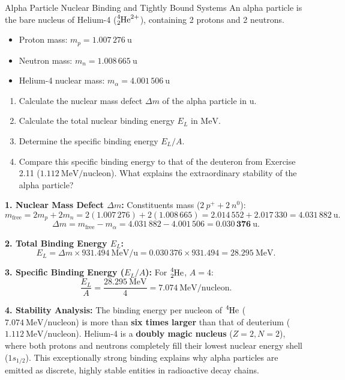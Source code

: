 \begin{exercise}{Alpha Particle Nuclear Binding and Tightly Bound Systems}
An alpha particle is the bare nucleus of Helium-4 ($\ce{^{4}_{2}He}^{2+}$), containing 2 protons and 2 neutrons.
\begin{itemize}[itemsep=1pt]
  \item Proton mass: $m_p = 1.007\,276\ \mathrm{u}$
  \item Neutron mass: $m_n = 1.008\,665\ \mathrm{u}$
  \item Helium-4 nuclear mass: $m_\alpha = 4.001\,506\ \mathrm{u}$
\end{itemize}
\begin{enumerate}[leftmargin=1.5em,itemsep=2pt]
  \item Calculate the nuclear mass defect $\Delta m$ of the alpha particle in $\mathrm{u}$.
  \item Calculate the total nuclear binding energy $E_L$ in $\mathrm{MeV}$.
  \item Determine the specific binding energy $E_L/A$.
  \item Compare this specific binding energy to that of the deuteron from Exercise 2.11 ($1.112\ \mathrm{MeV/nucleon}$). What explains the extraordinary stability of the alpha particle?
\end{enumerate}
\end{exercise}

\begin{tabletworkspace}[5.0cm]
\end{tabletworkspace}

\begin{solution}
\textbf{1. Nuclear Mass Defect $\Delta m$:}
Constituents mass ($2\ p^+ + 2\ n^0$):
\[
m_{\text{free}} = 2 m_p + 2 m_n = 2(1.007\,276) + 2(1.008\,665) = 2.014\,552 + 2.017\,330 = 4.031\,882\ \mathrm{u}.
\]
\[
\Delta m = m_{\text{free}} - m_\alpha = 4.031\,882 - 4.001\,506 = \mathbf{0.030\,376\ \mathrm{u}}.
\]

\textbf{2. Total Binding Energy $E_L$:}
\[
E_L = \Delta m \times 931.494\ \mathrm{MeV/u} = 0.030\,376 \times 931.494 = \mathbf{28.295\ \mathrm{MeV}}.
\]

\textbf{3. Specific Binding Energy ($E_L/A$):}
For $\ce{^{4}_{2}He}$, $A = 4$:
\[
\frac{E_L}{A} = \frac{28.295\ \mathrm{MeV}}{4} = \mathbf{7.074\ \mathrm{MeV/nucleon}}.
\]

\textbf{4. Stability Analysis:}
The binding energy per nucleon of $\ce{^{4}He}$ ($7.074\ \mathrm{MeV/nucleon}$) is more than \textbf{six times larger} than that of deuterium ($1.112\ \mathrm{MeV/nucleon}$).
Helium-4 is a \textbf{doubly magic nucleus} ($Z = 2, N = 2$), where both protons and neutrons completely fill their lowest nuclear energy shell ($1s_{1/2}$). This exceptionally strong binding explains why alpha particles are emitted as discrete, highly stable entities in radioactive decay chains.
\end{solution}

